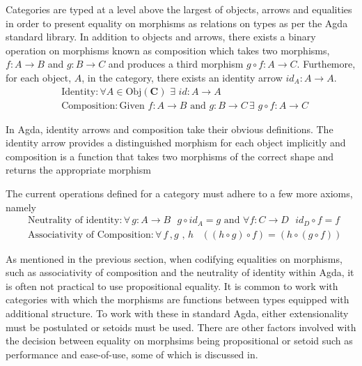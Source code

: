 Categories are typed at a level above the largest of objects, arrows and
equalities in order to present equality on morphisms as relations on types as
per the Agda standard library. In addition to objects and arrows, there exists a
binary operation on morphisms known as composition which takes two morphisms,
$f : A \rightarrow B$ and $g : B \rightarrow C$ and produces a third morphism
$g \circ f : A \rightarrow C$. Furthemore, for each object, $A$, in the
category, there exists an identity arrow $id_{A} : A \rightarrow A$.
\begin{align*}
    &\textrm{Identity} : \forall A \in \textrm{Obj}(\textbf{C}) \, \, \exists \, \, id : A \rightarrow A \\
    &\textrm{Composition} : \textrm{Given } f : A \rightarrow B
    \textrm{ and } g : B \rightarrow C \, \exists \, \, g \circ f : A \rightarrow C
\end{align*}

In Agda, identity arrows and composition take their obvious definitions. The identity
arrow provides a distinguished morphism for each object implicitly and
composition is a function that takes two morphisms of the correct shape and
returns the appropriate morphism

The current operations defined for a category must adhere to a few more axioms,
namely
\begin{align*}
    &\textrm{Neutrality of identity} : \forall \, g : A \rightarrow B \, \, \, \,
    g \circ id_{A} = g \textrm{  and    } \forall f : C \rightarrow D \, \,  \, \,
    id_{D} \circ f = f \\
    &\textrm{Associativity of Composition} : \forall \, f \, , g \, \, , \,  h \, \, \,
    \, \, ((h \circ g) \circ f) = (h \circ (g \circ f))
\end{align*}

As mentioned in the previous section, when codifying equalities on morphisms,
such as associativity of composition and the neutrality of identity within
Agda, it is often not practical to use propositional equality. It is common to
work with categories with which the morphisms are functions between types
equipped with additional structure. To work with these in standard Agda, either
extensionality must be postulated or setoids must be used. There are other
factors involved with the decision between equality on morphsims being
propositional or setoid such as performance and ease-of-use, some of which is
discussed in.

